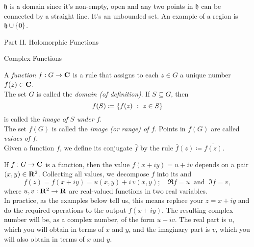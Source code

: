 \begin{example}
$\mathfrak{h}$ is a domain since it's non-empty, open and any two points in $\mathfrak{h}$ can be connected by a straight line. It's an unbounded set. An example of a region is $\mathfrak{h} \cup \left\{0\right\}$.
\end{example}


\begin{mdframed}[backgroundcolor=paleyellow,linewidth=1pt]
\begin{center}
{\sc\Large Part II. Holomorphic Functions}
\end{center}
\end{mdframed}

\begin{mdframed}
\begin{center}
{\Large Complex Functions}
\end{center}
\end{mdframed}

\begin{definition}
A \emph{function} $f:G \to \mathbf C$ is a rule that assigns to each $z\in G$ a unique number $f(z) \in \mathbf C$.\\[0.5em]
The set $G$ is called the \emph{domain (of definition)}. If $S \subseteq G$, then
\[f(S) \coloneqq \left\{f(z)\ :\ z\in S\right\}\]
is called the \emph{image of $S$ under $f$}.\\[0.5em]
The set $f(G)$ is called the \emph{image (or range) of $f$}. Points in $f(G)$ are called \emph{values of $f$}.\\[1em]
Given a function $f$, we define its conjugate $\bar{f}$ by the rule $\bar{f}(z) \coloneqq \overline{f(z)}$.
\end{definition}

\vspace*{1em}

\begin{discussion}
If $f:G \to \mathbf C$ is a function, then the value $f(x+iy) = u + iv$ depends on a pair $(x,y) \in \mathbf R^2$. Collecting all values, we decompose $f$ into its  and 
\[f(z) = f(x+iy) = u(x,y) + i\,v(x,y);\quad \Re f = u \ \text{ and } \ \Im f = v,\] where $u,v: \mathbf R^2 \to \mathbf R$ are real-valued functions in two real variables.\\[1em]
In practice, as the examples below tell us, this means replace your $z = x + iy$ and do the required operations to the output $f(x + iy)$. The resulting complex number will be, as a complex number, of the form $u + iv$. The real part is $u$, which you will obtain in terms of $x$ and $y$, and the imaginary part is $v$, which you will also obtain in terms of $x$ and $y$. 
\end{discussion}

